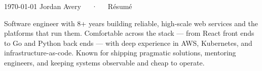\documentclass[11pt, a4paper]{awesome-cv}
\begin{document}
\makecvheader[C]
\makecvfooter
  {\today}
  {Jordan Avery~~~·~~~R\'esum\'e}
  {\thepage}


\begin{cvparagraph}
Software engineer with 8+ years building reliable, high-scale web services and the
platforms that run them. Comfortable across the stack — from React front ends to Go and
Python back ends — with deep experience in AWS, Kubernetes, and infrastructure-as-code.
Known for shipping pragmatic solutions, mentoring engineers, and keeping systems
observable and cheap to operate.
\end{cvparagraph}
\end{document}
